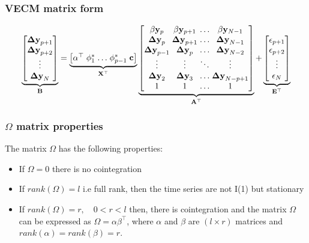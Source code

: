 \documentclass{beamer}
\begin{document}
\begin{frame}
\frametitle{VECM matrix form}
\small
\begin{equation*}
\underbrace{
      \begin{bmatrix}
       \mathbf{\Delta y}_{p+1}  \\ 
       \mathbf{\Delta y}_{p+2}  \\ 
       \vdots                   \\ 
       \mathbf{\Delta y}_N      
      \end{bmatrix}}_{\mathbf{B} } =
\arraycolsep=1.4pt  
\underbrace{\begin{bmatrix}
   \alpha^\top & \phi^*_1 & \dots & \phi^*_{p-1} &\mathbf{c}   
  \end{bmatrix}}_{\mathbf{X}^\top}
\underbrace{\begin{bmatrix}
 \beta\mathbf{y}_p      & \beta\mathbf{y}_{p+1}   & \dots&   \beta\mathbf{y}_{N-1}   \\
 \mathbf{\Delta y}_{p}   & \mathbf{\Delta y}_{p+1}& \dots &  \mathbf{\Delta y}_{N-1} \\
 \mathbf{\Delta y}_{p-1} & \mathbf{\Delta y}_{p}  & \dots &  \mathbf{\Delta y}_{N-2}   \\
 \vdots                  & \vdots                 & \ddots&  \vdots                   \\
 \mathbf{\Delta y}_{2}   & \mathbf{\Delta y}_{3} & \dots &   \mathbf{\Delta y}_{N-p+1} \\
 1                      & 1                       & \dots     & 1   
 \end{bmatrix}}_{\mathbf{A}^\top}
+
\underbrace{\begin{bmatrix}
              \mathbf{\epsilon}_{p+1} \\ 
              \mathbf{\epsilon}_{p+2} \\ 
              \vdots \\ 
              \mathbf{\epsilon}_N
             \end{bmatrix}}_{\mathbf{E}^\top}
\end{equation*}
\end{frame}

\begin{frame}
\frametitle{$\Omega$ matrix properties}
The matrix $\Omega$ has the following properties:
\begin{itemize}
\item If $\Omega = 0$ there is no cointegration
\item If $rank(\Omega)=l$ i.e full rank, then the time series are not
I(1) but stationary
\item If $rank(\Omega)=r,\quad 0 < r < l$ then, there is cointegration
and the matrix $\Omega$ can be expressed as $\Omega =
\alpha \beta^\top$, where $\alpha$ and $\beta$ are $(l \times r)$
matrices and $rank(\alpha)=rank(\beta)=r$.
\end{itemize}
\end{frame}
\end{document}
